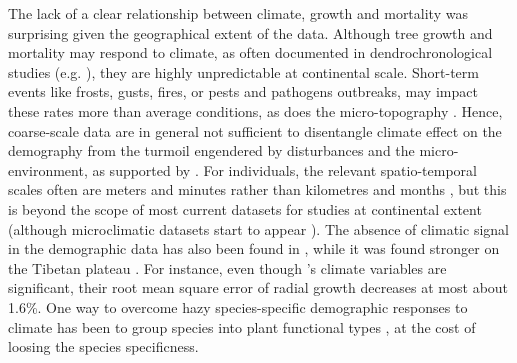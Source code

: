 The lack of a clear relationship between climate, growth and mortality was
surprising given the geographical extent of the data. Although tree growth and
mortality may respond to climate, as often documented in dendrochronological
studies (e.g. \citet{Aussenac2017}), they are highly unpredictable at
continental scale. Short-term events like frosts, gusts, fires, or pests and
pathogens outbreaks, may impact these rates more than average conditions, as
does the micro-topography \citep{Loehle1996}. Hence, coarse-scale data are in
general not sufficient to disentangle climate effect on the demography from
the turmoil engendered by disturbances and the micro-environment, as supported
by \citet[and references therein]{Lembrechts2019}. For individuals, the
relevant spatio-temporal scales often are meters and minutes rather than
kilometres and months \citep{Urban2016}, but this is beyond the scope of most
current datasets for studies at continental extent (although microclimatic
datasets start to appear \citep{Lembrechts2019}). The absence of climatic
signal in the demographic data has also been found in \citet{Subedi2013},
while it was found stronger on the Tibetan plateau \citep{Liang2010}. For
instance, even though \citeauthor{Subedi2013}'s climate variables are significant, their root mean
square error of radial growth decreases at most about \num{1.6}\%. One way to
overcome hazy species-specific demographic responses to climate has been to
group species into plant functional types \citep{Vanderwel2013}, at the cost
of loosing the species specificness. \\

